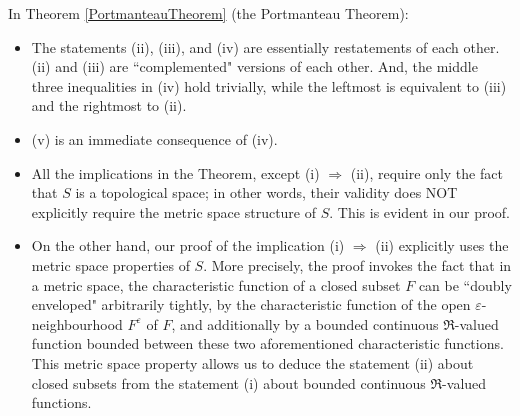 \begin{remark}\mbox{}\;
In Theorem \ref{PortmanteauTheorem} (the Portmanteau Theorem):
\begin{itemize}
\item	The statements (ii), (iii), and (iv) are essentially restatements of each other.
		(ii) and (iii) are ``complemented" versions of each other.
		And, the middle three inequalities in (iv) hold trivially, while the leftmost is equivalent to (iii) and the rightmost to (ii).
\item	(v) is an immediate consequence of (iv).
\item	All the implications in the Theorem, except (i) $\Longrightarrow$ (ii), require only the fact that $S$ is a topological space;
		in other words, their validity does NOT explicitly require the metric space structure of $S$.
		This is evident in our proof.
\item	On the other hand, our proof of the implication (i) $\Longrightarrow$ (ii) explicitly uses the metric space properties of $S$.
		More precisely, the proof invokes the fact that in a metric space, the characteristic function
		of a closed subset $F$ can be ``doubly enveloped" arbitrarily tightly, by the characteristic function of the
		open $\varepsilon$-neighbourhood $F^{\varepsilon}$ of $F$, and additionally by a bounded continuous
		$\Re$-valued function bounded between these two aforementioned characteristic functions.
		This metric space property allows us to deduce the statement (ii) about closed subsets
		from the statement (i) about bounded continuous $\Re$-valued functions.
\end{itemize}
\end{remark}

